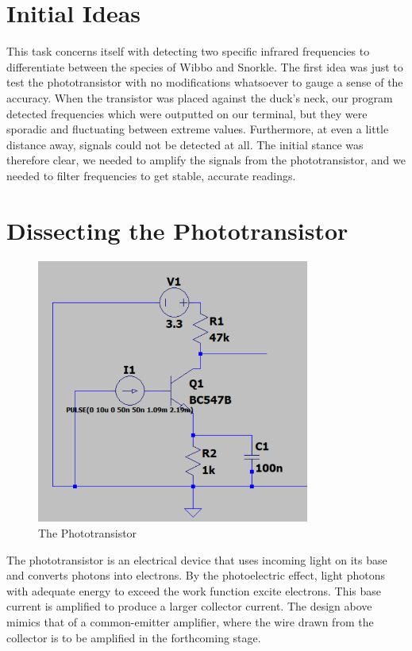 \section{Initial Ideas}
This task concerns itself with detecting two specific infrared frequencies to differentiate between the species of Wibbo and Snorkle. The first idea was just to test the phototransistor with no modifications whatsoever to gauge a sense of the accuracy. When the transistor was placed against the duck’s neck, our program detected frequencies which were outputted on our terminal, but they were sporadic and fluctuating between extreme values. Furthermore, at even a little distance away, signals could not be detected at all. The initial stance was therefore clear, we needed to amplify the signals from the phototransistor, and we needed to filter frequencies to get stable, accurate readings.

\section{Dissecting the Phototransistor}
\begin{figure}[h]
    \centering
    \includegraphics[width=0.8\textwidth]{subpages/images/phototransistor.png}
    \caption{The Phototransistor}
    \label{fig:phototransistor}
\end{figure}

The phototransistor is an electrical device that uses incoming light on its base and converts photons into electrons. By the photoelectric effect, light photons with adequate energy to exceed the work function excite electrons. This base current is amplified to produce a larger collector current. The design above mimics that of a common-emitter amplifier, where the wire drawn from the collector is to be amplified in the forthcoming stage.


